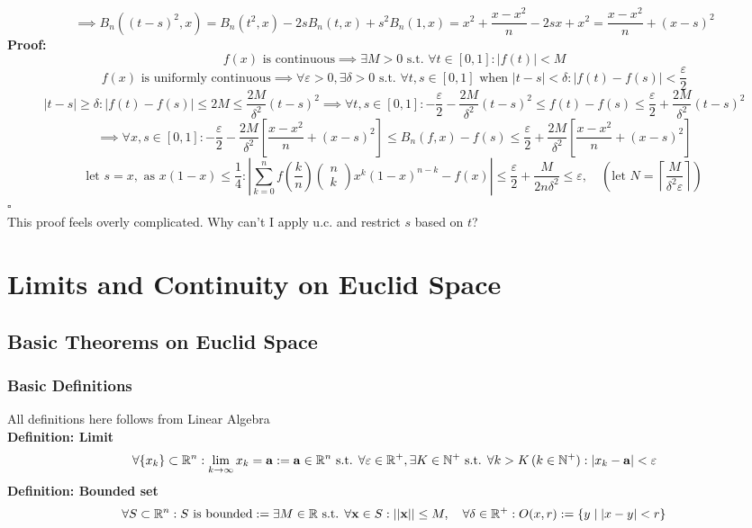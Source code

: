 \documentclass{article}
\newcommand{\R}{\mathbb{R}}
\newcommand{\N}{\mathbb{N}}
\newcommand{\st}{\mbox{ s.t. }}
\newcommand{\0}{{\bf{0}}}
\begin{document}
$$\implies B_n((t-s)^2,x)=B_n(t^2,x)-2sB_n(t,x)+s^2B_n(1,x)=x^2+\frac{x-x^2}{n}-2sx+x^2=\frac{x-x^2}{n}+(x-s)^2$$
\textbf{Proof:}
$$f(x)\mbox{ is continuous}\implies\exists M>0\st\forall t\in[0,1]:|f(t)|<M$$
$$f(x)\mbox{ is uniformly continuous}\implies\forall\varepsilon>0,\exists\delta>0\st\forall t,s\in[0,1]\mbox{ when }|t-s|<\delta:|f(t)-f(s)|<\frac{\varepsilon}{2}$$
$$|t-s|\geq\delta:|f(t)-f(s)|\le2M\le\frac{2M}{\delta^2}(t-s)^2\implies\forall t,s\in[0,1]:-\frac{\varepsilon}{2}-\frac{2M}{\delta^2}(t-s)^2\le f(t)-f(s)\le\frac{\varepsilon}{2}+\frac{2M}{\delta^2}(t-s)^2$$
$$\implies\forall x,s\in[0,1]:-\frac{\varepsilon}{2}-\frac{2M}{\delta^2}\left[\frac{x-x^2}{n}+(x-s)^2\right]\le B_n(f,x)-f(s)\le\frac{\varepsilon}{2}+\frac{2M}{\delta^2}\left[\frac{x-x^2}{n}+(x-s)^2\right]$$
$$\mbox{let }s=x,\mbox{ as }x(1-x)\le\frac{1}{4}:\left|\sum_{k=0}^nf\left(\frac{k}{n}\right)\begin{pmatrix}
n\\
k
\end{pmatrix}x^k(1-x)^{n-k}-f(x)\right|\le\frac{\varepsilon}{2}+\frac{M}{2n\delta^2}\le\varepsilon,\quad\left(\mbox{let }N=\left\lceil\frac{M}{\delta^2\varepsilon}\right\rceil\right)$$
\null\hfill{$\square$}\\
This proof feels overly complicated. Why can't I apply u.c. and restrict $s$ based on $t$?
\clearpage
\section{Limits and Continuity on Euclid Space}
\subsection{Basic Theorems on Euclid Space}
\subsubsection{Basic Definitions}
All definitions here follows from Linear Algebra\\
\textbf{Definition: Limit}
$$\forall\{x_k\}\subset\R^n:\lim_{k\to\infty}{x}_k={\bf{a}}:={\bf{a}}\in\R^n\st\forall\varepsilon\in\R^+,\exists K\in\N^+\st\forall k>K \,(k\in\N^+):|{x}_k-{\bf{a}}|<\varepsilon$$
\textbf{Definition: Bounded set}
$$\forall S\subset\R^n:S\mbox{ is bounded}:=\exists M\in\R\st\forall{\bf{x}}\in S:||{\bf{x}}||\le M,\quad \forall\delta\in\R^+:O(x,r):=\{y\mid |x-y|<r\}$$
\end{document}
